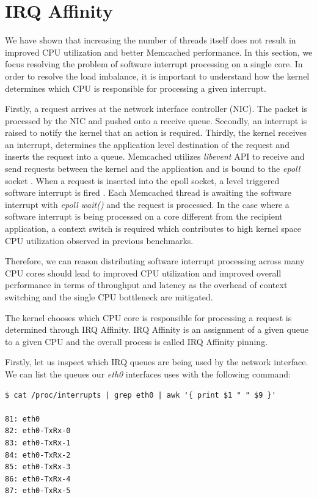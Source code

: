 \section{IRQ Affinity}
\label{sec:m_irq_affinity}
We have shown that increasing the number of threads itself does not result in improved CPU utilization and better Memcached performance. In this section, we focus resolving the problem of software interrupt processing on a single core. In order to resolve the load imbalance, it is important to understand how the kernel determines which CPU is responsible for processing a given interrupt.

Firstly, a request arrives at the network interface controller (NIC). The packet is processed by the NIC and pushed onto a receive queue. Secondly, an interrupt is raised to notify the kernel that an action is required. Thirdly, the kernel receives an interrupt, determines the application level destination of the request and inserts the request into a queue. Memcached utilizes \textit{libevent} API to receive and send requests between the kernel and the application and is bound to the \textit{epoll} socket \cite{zhang2014efficient}. When a request is inserted into the epoll socket, a level triggered software interrupt is fired \cite{blacklibtorque}. Each Memcached thread is awaiting the software interrupt with \textit{epoll wait()} \cite{thongprasit2015toward} and the request is processed. In the case where a software interrupt is being processed on a core different from the recipient application, a context switch is required which contributes to high kernel space CPU utilization observed in previous benchmarks.

Therefore, we can reason distributing software interrupt processing across many CPU cores should lead to improved CPU utilization and improved overall performance in terms of throughput and latency as the overhead of context switching and the single CPU bottleneck are mitigated.

The kernel chooses which CPU core is responsible for processing a request is determined through IRQ Affinity. IRQ Affinity is an assignment of a given queue to a given CPU and the overall process is called IRQ Affinity pinning.

Firstly, let us inspect which IRQ queues are being used by the network interface. We can list the queues our \textit{eth0} interfaces uses with the following command:
\begin{lstlisting}
$ cat /proc/interrupts | grep eth0 | awk '{ print $1 " " $9 }'

81: eth0
82: eth0-TxRx-0
83: eth0-TxRx-1
84: eth0-TxRx-2
85: eth0-TxRx-3
86: eth0-TxRx-4
87: eth0-TxRx-5
\end{lstlisting}

